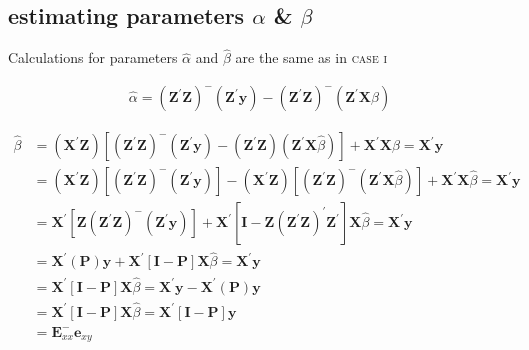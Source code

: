 \documentclass[10pt, twoside, openleft]{article}
\newcommand{\alphahat}{\hat{\alpha}} %
\newcommand{\betahat}{\hat{\beta}} %
\begin{document}
\begin{center}
\subsection{estimating parameters $\alpha$ \& $\beta$}
\vspace{-3ex}
\end{center}

\noindent
Calculations for parameters $\alphahat$ and $\betahat$ are the same as in \textsc{case i}
\smallskip

\begin{equation*}
\begin{aligned}
\alphahat = ( \mathbf{Z}^{'} \mathbf{Z} )^{-} ( \mathbf{Z}^{'} \mathbf{y} ) -
( \mathbf{Z}^{'} \mathbf{Z} )^{-} ( \mathbf{Z}^{'} \mathbf{X} \betahat )
\end{aligned}
\end{equation*}
\smallskip

\begin{equation*}
\begin{aligned}
\betahat & = ( \mathbf{X}^{'} \mathbf{Z} ) [ ( \mathbf{Z}^{'} \mathbf{Z})^{-}
( \mathbf{Z}^{'} \mathbf{y} ) - ( \mathbf{Z}^{'} \mathbf{Z} ) ( \mathbf{Z}^{'} \mathbf{X}
\betahat ) ] + \mathbf{X}^{'} \mathbf{X} \betahat = \mathbf{X}^{'} \mathbf{y} \\
	 & = ( \mathbf{X}^{'} \mathbf{Z} ) [ (\mathbf{Z}^{'} \mathbf{Z} )^{-}
( \mathbf{Z}^{'} \mathbf{y} ) ] - ( \mathbf{X}^{'} \mathbf{Z} )
[ ( \mathbf{Z}^{'} \mathbf{Z} )^{-} ( \mathbf{Z}^{'} \mathbf{X}
\betahat ) ] + \mathbf{X}^{'} \mathbf{X} \betahat = \mathbf{X}^{'} \mathbf{y} \\
	 & = \mathbf{X}^{'} [ \mathbf{Z} ( \mathbf{Z}^{'} \mathbf{Z} )^{-}
( \mathbf{Z}^{'} \mathbf{y} ) ] + \mathbf{X}^{'} [ \mathbf{I} - \mathbf{Z}
( \mathbf{Z}^{'} \mathbf{Z} )^{'} \mathbf{Z}^{'} ] \mathbf{X} \betahat = \mathbf{X}^{'} \mathbf{y} \\
	 & = \mathbf{X}^{'} ( \mathbf{P} ) \mathbf{y} + \mathbf{X}^{'} [ \mathbf{I} - \mathbf{P}]
\mathbf{X} \betahat = \mathbf{X}^{'} \mathbf{y} \\
	 & = \mathbf{X}^{'} [ \mathbf{I} - \mathbf{P} ] \mathbf{X} \betahat = \mathbf{X}^{'} \mathbf{y}
- \mathbf{X}^{'} ( \mathbf{P} ) \mathbf{y} \\
	 & = \mathbf{X}^{'} [ \mathbf{I} - \mathbf{P} ] \mathbf{X} \betahat = \mathbf{X}^{'}
[ \mathbf{I} - \mathbf{P} ] \mathbf{y} \\
	 & = \mathbf{E}_{xx}^{-} \mathbf{e}_{xy}
\end{aligned}
\end{equation*}
\smallskip
\end{document}

